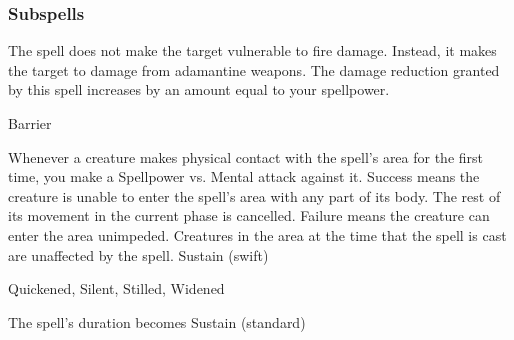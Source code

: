 \subsubsection{Subspells}
The spell does not make the target vulnerable to fire damage.
Instead, it makes the target  to damage from adamantine weapons.
The damage reduction granted by this spell increases by an amount equal to your spellpower.
\begin{spellsection}{Barrier}
\begin{spellcontent}
\begin{spelltargetinginfo}
\end{spelltargetinginfo}
\begin{spelleffects}
\spelleffect
Whenever a creature makes physical contact with the spell's area for the first time, you make a Spellpower vs. Mental attack against it.
Success means the creature is unable to enter the spell's area with any part of its body.
The rest of its movement in the current phase is cancelled.
Failure means the creature can enter the area unimpeded.
Creatures in the area at the time that the spell is cast are unaffected by the spell.
\spelldur Sustain (swift)
\end{spelleffects}
\end{spellcontent}
\begin{spellfooter}
 Quickened, Silent, Stilled, Widened
\end{spellfooter}
\begin{spellsubcontent}
\begin{spellcantrip}
The spell's duration becomes Sustain (standard)
\end{spellcantrip}
\end{spellsubcontent}
\end{spellsection}
